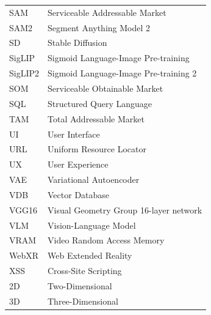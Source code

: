 \begin{longtable}{p{3cm} p{10cm}}
    SAM & Serviceable Addressable Market \\[0.3cm]
    SAM2 & Segment Anything Model 2 \\[0.3cm]
    SD & Stable Diffusion \\[0.3cm]
    SigLIP & Sigmoid Language-Image Pre-training \\[0.3cm]
    SigLIP2 & Sigmoid Language-Image Pre-training 2 \\[0.3cm]
    SOM & Serviceable Obtainable Market \\[0.3cm]
    SQL & Structured Query Language \\[0.3cm]
    TAM & Total Addressable Market \\[0.3cm]
    UI & User Interface \\[0.3cm]
    URL & Uniform Resource Locator \\[0.3cm]
    UX & User Experience \\[0.3cm]
    VAE & Variational Autoencoder \\[0.3cm]
    VDB & Vector Database \\[0.3cm]
    VGG16 & Visual Geometry Group 16-layer network \\[0.3cm]
    VLM & Vision-Language Model \\[0.3cm]
    VRAM & Video Random Access Memory \\[0.3cm]
    WebXR & Web Extended Reality \\[0.3cm]
    XSS & Cross-Site Scripting \\[0.3cm]
    2D & Two-Dimensional \\[0.3cm]
    3D & Three-Dimensional \\[0.3cm]
    
\end{longtable}
